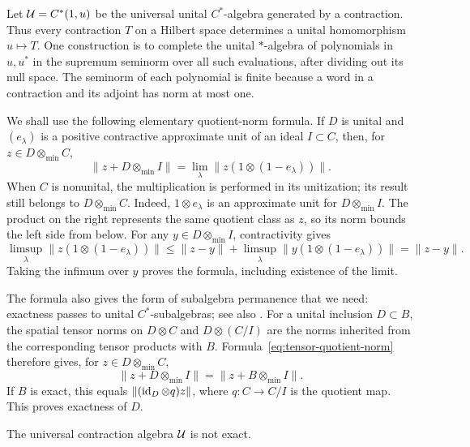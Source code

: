Let $\mathcal U=C^*(1,u)$ be the universal
unital $C^*$-algebra generated by a contraction.  Thus every contraction
$T$ on a Hilbert space determines a unital homomorphism $u\mapsto T$.
One construction is to complete the unital $*$-algebra of polynomials
in $u,u^*$ in the supremum seminorm over all such evaluations, after
dividing out its null space.  The seminorm of each polynomial is finite
because a word in a contraction and its adjoint has norm at most one.

We shall use the following elementary quotient-norm formula.  If $D$
is unital and $(e_\lambda)$ is a positive contractive approximate unit
of an ideal $I\subset C$, then, for $z\in D\otimes_{\min}C$,
\begin{equation}\label{eq:tensor-quotient-norm}
 \|z+D\otimes_{\min}I\|
 =\lim_\lambda\|z(1\otimes(1-e_\lambda))\|.
\end{equation}
When $C$ is nonunital, the multiplication is performed in its
unitization; its result still belongs to $D\otimes_{\min}C$.
Indeed, $1\otimes e_\lambda$ is an approximate unit for
$D\otimes_{\min}I$.  The product on the right represents the same
quotient class as $z$, so its norm bounds the left side from below.
For any $y\in D\otimes_{\min}I$, contractivity gives
\[
 \limsup_\lambda\|z(1\otimes(1-e_\lambda))\|
 \leq \|z-y\|
       +\limsup_\lambda\|y(1\otimes(1-e_\lambda))\|
 =\|z-y\|.
\]
Taking the infimum over $y$ proves the formula, including existence of
the limit.

The formula also gives the form of subalgebra permanence that we need:
exactness passes to unital $C^*$-subalgebras; see also
\cite[IV.3.4.3]{Blackadar}.  For a unital inclusion $D\subset B$, the spatial
tensor norms on $D\otimes C$ and $D\otimes(C/I)$ are the norms
inherited from the corresponding tensor products with $B$.
Formula~\eqref{eq:tensor-quotient-norm} therefore gives, for
$z\in D\otimes_{\min}C$,
\[
 \|z+D\otimes_{\min}I\|
 =\|z+B\otimes_{\min}I\|.
\]
If $B$ is exact, this equals
$\|(\operatorname{id}_D\otimes q)z\|$, where $q:C\to C/I$ is the quotient map.
This proves exactness of $D$.

\begin{lemma}\label{lem:nonexact-universal}
The universal contraction algebra $\mathcal U$ is not exact.
\end{lemma}

